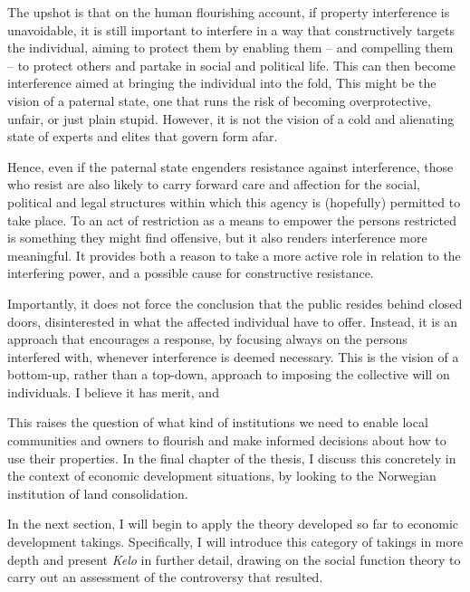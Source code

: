 {The upshot is that on the human flourishing account, if property interference is unavoidable, it is still important to interfere in a way that constructively targets the individual, aiming to protect them by enabling them -- and compelling them -- to protect others and partake in social and political life. This can then become interference aimed at bringing the individual into the fold,  This might be the vision of a paternal state, one that runs the risk of becoming overprotective, unfair, or just plain stupid. However, it is 
not the vision of a cold and alienating state of experts and elites that govern form afar.

Hence, even if the paternal state engenders resistance against interference, those who resist are also likely to carry forward care and affection for the social, political and legal structures within which this agency is (hopefully) permitted to take place. To  an act of restriction as a means to empower the persons restricted is something they might find offensive, but it also renders interference more meaningful. It provides both a reason to take a more active role in relation to the interfering power, and a possible cause for constructive resistance. 

Importantly, it does not force the conclusion that the public resides behind closed doors, disinterested in what the affected individual have to offer. Instead, it is an approach that encourages a response, by focusing always on the persons interfered with, whenever interference is deemed necessary. This is the vision of a bottom-up, rather than a top-down, approach to imposing the collective will on individuals. I believe it has merit, and 
}

This raises the question of what kind of institutions we need to enable local communities and owners to  flourish and make informed decisions about how to use their properties. In the final chapter of the thesis, I discuss this concretely in the context of economic development situations, by looking to the Norwegian institution of land consolidation.

In the next section, I will begin to apply the theory developed so far to economic development takings. Specifically, I will introduce this category of takings in more depth and present {\it Kelo} in further detail, drawing on the social function theory to carry out an assessment of the controversy that resulted.

